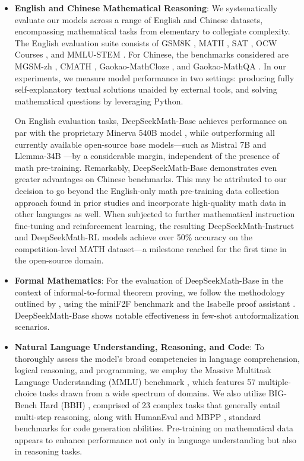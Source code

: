 \begin{itemize}[topsep=0pt]
    \item \textbf{English and Chinese Mathematical Reasoning}: We systematically evaluate our models across a range of English and Chinese datasets, encompassing mathematical tasks from elementary to collegiate complexity. The English evaluation suite consists of GSM8K \citep{gsm8k}, MATH \citep{MATH}, SAT \citep{llemma}, OCW Courses \citep{minerva}, and MMLU-STEM \citep{mmlu}. For Chinese, the benchmarks considered are MGSM-zh \citep{mgsm}, CMATH \citep{wei2023cmath}, Gaokao-MathCloze \citep{agieval}, and Gaokao-MathQA \citep{agieval}. In our experiments, we measure model performance in two settings: producing fully self-explanatory textual solutions unaided by external tools, and solving mathematical questions by leveraging Python.

On English evaluation tasks, DeepSeekMath-Base achieves performance on par with the proprietary Minerva 540B model \citep{minerva}, while outperforming all currently available open-source base models—such as Mistral 7B \citep{mistral} and Llemma-34B \citep{llemma}—by a considerable margin, independent of the presence of math pre-training. Remarkably, DeepSeekMath-Base demonstrates even greater advantages on Chinese benchmarks. This may be attributed to our decision to go beyond the English-only math pre-training data collection approach found in prior studies \citep{minerva,llemma} and incorporate high-quality math data in other languages as well. When subjected to further mathematical instruction fine-tuning and reinforcement learning, the resulting DeepSeekMath-Instruct and DeepSeekMath-RL models achieve over 50\% accuracy on the competition-level MATH dataset—a milestone reached for the first time in the open-source domain.

\item \textbf{Formal Mathematics}: For the evaluation of DeepSeekMath-Base in the context of informal-to-formal theorem proving, we follow the methodology outlined by \citep{dsp_proof}, using the miniF2F benchmark \citep{minif2f} and the Isabelle proof assistant \citep{isabelle}. DeepSeekMath-Base shows notable effectiveness in few-shot autoformalization scenarios.

\item \textbf{Natural Language Understanding, Reasoning, and Code}: To thoroughly assess the model's broad competencies in language comprehension, logical reasoning, and programming, we employ the Massive Multitask Language Understanding (MMLU) benchmark \citep{mmlu}, which features 57 multiple-choice tasks drawn from a wide spectrum of domains. We also utilize BIG-Bench Hard (BBH) \citep{bbh}, comprised of 23 complex tasks that generally entail multi-step reasoning, along with HumanEval \citep{codex} and MBPP \citep{mbpp}, standard benchmarks for code generation abilities. Pre-training on mathematical data appears to enhance performance not only in language understanding but also in reasoning tasks.


\end{itemize}
